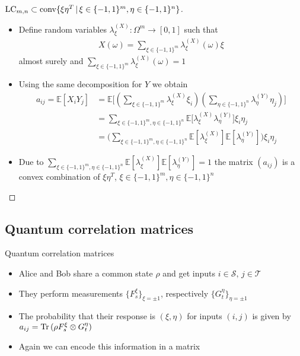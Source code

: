 \begin{frame}
	\begin{proof}[$   \textup{LC}_{m,n}  \subset \textup{conv} \{  \xi\eta^T \, | \, \xi \in \{-1,1\}^m, \eta \in \{-1,1\}^n     \} $]
		\begin{itemize}
			\item<1-> {\footnotesize Define random variables $ \lambda_{\xi}^{(X)}: \Omega^m \to [0,1] $ such that 
			\begin{align*}
			X(\omega) = \sum_{\xi \in \{-1,1\}^m}\lambda_{\xi}^{(X)}(\omega)\xi
			\end{align*} 
			almost surely 
			and $ \sum_{\xi \in \{-1,1\}^m}\lambda_{\xi}^{(X)}(\omega) = 1  $}
			\item<2-> Using the same decomposition for $ Y $ we obtain 
			\begin{align*}
			a_{ij} = \mathbb{E}[X_iY_j] &= \mathbb{E} \big [  (\sum_{\xi \in \{-1,1\}^m}\lambda_{\xi}^{(X)}\xi_i ) (\sum_{\eta \in \{-1,1\}^n}\lambda_{\eta}^{(Y)}\eta_j ) \big ]   \\
			&= \sum_{\xi \in \{-1,1\}^m, \eta \in \{-1,1\}^n} \mathbb{E}\big [\lambda_{\xi}^{(X)}\lambda_{\eta}^{(Y)} \big ] \xi_i \eta_j  \\
			&= \big (\sum_{\xi \in \{-1,1\}^m, \eta \in \{-1,1\}^n}\mathbb{E} [\lambda_{\xi}^{(X)} ]\mathbb{E}[\lambda_{\eta}^{(Y)}]\big )\xi_i\eta_j
			\end{align*}
			\item<3-> Due to $ \sum_{\xi \in \{-1,1\}^m, \eta \in \{-1,1\}^n}\mathbb{E} [\lambda_{\xi}^{(X)} ]\mathbb{E}[\lambda_{\eta}^{(Y)}] = 1 $
			the matrix $ (a_{ij}) $ is a convex combination of $ \xi \eta^T $, $ \xi \in \{-1,1\}^m, \eta \in \{-1,1 \}^n $
		\end{itemize}
	\end{proof}
\end{frame}



\subsection{Quantum correlation matrices}

\begin{frame}[label = QCMot]{Quantum correlation matrices}
	\begin{itemize}
		\item<1-> Alice and Bob share a common state $ \rho $ and get inputs $ i \in \mathcal{S}, \, j \in \mathcal{T} $ 
		\item<2-> They perform measurements $ \{ F_s^{\xi} \}_{\xi = \pm 1} $, respectively $ \{ G_t^{\eta} \}_{\eta = \pm 1} $
		\item <3-> The probability that their response is $ (\xi,\eta) $ for inputs $ (i,j) $ is given by 
		$ a_{ij} = \textup{Tr} \, {(\rho F_s^\xi \otimes G_t^\eta )}  $
		\item<4-> Again we can encode this information in a matrix
	\end{itemize}
	\hyperlink{LCMot}{}
\end{frame}

